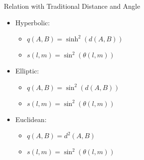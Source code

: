 \documentclass[10pt,ignorenonframetext,serif,onlymath]{beamer}
\providecommand{\tightlist}{%
  \setlength{\itemsep}{0pt}\setlength{\parskip}{0pt}}
\begin{document}
\begin{frame}{Relation with Traditional Distance and Angle}
\protect\hypertarget{sec:relation-with-traditional-distance-and-angle}{}

\begin{itemize}
\tightlist
\item
  Hyperbolic:

  \begin{itemize}
  \tightlist
  \item
    \(q(A, B ) = \sinh^2(d(A, B))\)
  \item
    \(s(l, m ) = \sin^2(\theta(l, m))\)
  \end{itemize}
\item
  Elliptic:

  \begin{itemize}
  \tightlist
  \item
    \(q(A, B ) = \sin^2(d(A, B))\)
  \item
    \(s(l, m ) = \sin^2(\theta(l, m))\)
  \end{itemize}
\item
  Euclidean:

  \begin{itemize}
  \tightlist
  \item
    \(q(A, B ) = d^2(A, B)\)
  \item
    \(s(l, m ) = \sin^2(\theta(l, m))\)
  \end{itemize}
\end{itemize}

\end{frame}
\end{document}
